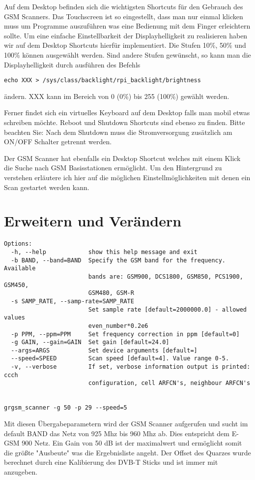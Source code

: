Auf dem Desktop befinden sich die wichtigsten Shortcuts für den Gebrauch des GSM Scanners. Das Touchscreen ist so eingestellt, dass man nur einmal klicken muss um Programme auszuführen was eine Bedienung mit dem Finger erleichtern sollte. Um eine einfache Einstellbarkeit der Displayhelligkeit zu realisieren haben wir auf dem Desktop Shortcuts hierfür implementiert. Die Stufen 10\%, 50\% und 100\% können ausgewählt werden. Sind andere Stufen gewünscht, so kann man die Displayhelligkeit durch ausführen des Befehls
\begin{verbatim}
echo XXX > /sys/class/backlight/rpi_backlight/brightness
\end{verbatim}
ändern. XXX kann im Bereich von 0 (0\%) bis 255 (100\%) gewählt werden. 

Ferner findet sich ein virtuelles Keyboard auf dem Desktop falls man mobil etwas schreiben möchte. Reboot und Shutdown Shortcuts sind ebenso zu finden. Bitte beachten Sie: Nach dem Shutdown muss die Stromversorgung zusätzlich am ON/OFF Schalter getrennt werden.

Der GSM Scanner hat ebenfalls ein Desktop Shortcut welches mit einem Klick die Suche nach GSM Basisstationen ermöglicht. Um den Hintergrund zu verstehen erläutere ich hier auf die möglichen Einstellmöglichkeiten mit denen ein Scan gestartet werden kann. 

\section{Erweitern und Verändern}


\begin{verbatim}
Options:
  -h, --help            show this help message and exit
  -b BAND, --band=BAND  Specify the GSM band for the frequency. Available
                        bands are: GSM900, DCS1800, GSM850, PCS1900, GSM450,
                        GSM480, GSM-R
  -s SAMP_RATE, --samp-rate=SAMP_RATE
                        Set sample rate [default=2000000.0] - allowed values
                        even_number*0.2e6
  -p PPM, --ppm=PPM     Set frequency correction in ppm [default=0]
  -g GAIN, --gain=GAIN  Set gain [default=24.0]
  --args=ARGS           Set device arguments [default=]
  --speed=SPEED         Scan speed [default=4]. Value range 0-5.
  -v, --verbose         If set, verbose information output is printed: ccch
                        configuration, cell ARFCN's, neighbour ARFCN's
                        
                   
grgsm_scanner -g 50 -p 29 --speed=5
\end{verbatim}
Mit diesen Übergabeparametern wird der GSM Scanner aufgerufen und sucht im default BAND das Netz von 925 Mhz bis 960 Mhz ab. Dies entspricht dem E-GSM 900 Netz. Ein Gain von 50 dB ist der maximalwert und ermöglicht somit die größte "Ausbeute" was die Ergebnisliste angeht. Der Offset des Quarzes wurde berechnet durch eine Kalibierung des DVB-T Sticks und ist immer mit anzugeben. 

